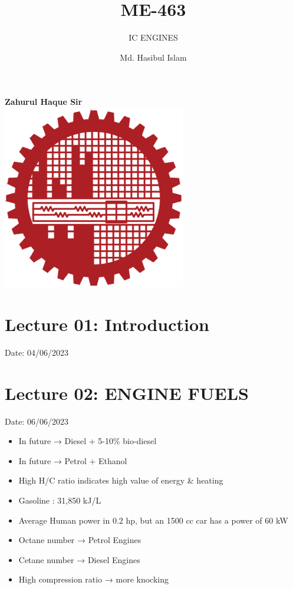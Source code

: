 \documentclass{article}
\title{ME-463}
\author{Md. Hasibul Islam}
\subtitle{IC ENGINES}
\begin{document}
\begin{titlepage}
    \centering
    
    {\Huge\bfseries\maketitle}
    \textbf{Zahurul Haque Sir} \\
    \vspace{2cm}
    \includegraphics[width=8cm]{institution_logo.jpg}
    \vfill
    \vspace*{2cm}
\end{titlepage}

\tableofcontents
\pagebreak
\section{Lecture 01: Introduction} 
\hfill Date: 04/06/2023

\section{Lecture 02: ENGINE FUELS} 
\hfill Date: 06/06/2023
\begin{itemize}
  \item In future → Diesel + 5-10\% bio-diesel
  \item In future → Petrol + Ethanol
  \item High H/C ratio indicates high value of energy \& heating
  \item Gasoline : 31,850 kJ/L 
  \item Average Human power in 0.2 hp, but an 1500 cc car has a power of 60 kW
  \item Octane number → Petrol Engines 
  \item Cetane number → Diesel Engines 
  \item High compression ratio → more knocking 
\end{itemize}
\end{document}
